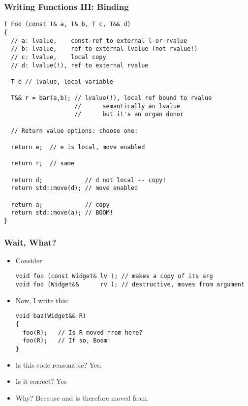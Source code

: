 
\begin{frame}[fragile]
\frametitle{Writing Functions III: Binding}
{\scriptsize
\begin{verbatim}
T Foo (const T& a, T& b, T c, T&& d)
{
  // a: lvalue,    const-ref to external l-or-rvalue
  // b: lvalue,    ref to external lvalue (not rvalue!)
  // c: lvalue,    local copy
  // d: lvalue(!), ref to external rvalue

  T e // lvalue, local variable

  T&& r = bar(a,b); // lvalue(!), local ref bound to rvalue
                    //      semantically an lvalue
                    //      but it's an organ donor

  // Return value options: choose one:

  return e;  // e is local, move enabled

  return r;  // same
  
  return d;            // d not local -- copy!
  return std::move(d); // move enabled

  return a;            // copy
  return std::move(a); // BOOM!
}
\end{verbatim}
}

\end{frame}



\begin{frame}[fragile]
\frametitle{Wait, What?}
\begin{itemize}
\item {}  Consider:
{\scriptsize
\begin{verbatim}
void foo (const Widget& lv ); // makes a copy of its arg
void foo (Widget&&      rv ); // destructive, moves from argument
\end{verbatim} }
\pause
\vskip 6pt
\item Now, I write this:
{\scriptsize
\begin{verbatim}
void baz(Widget&& R) 
{
  foo(R);   // Is R moved from here?
  foo(R);   // If so, Boom!
}
\end{verbatim}
}
\vskip 6pt
\pause
\item Is this code reasonable?  Yes.
\pause
\item Is it correct? Yes
\pause
\item Why?  Because  and is
therefore  moved from.

\end{itemize}

\end{frame}


